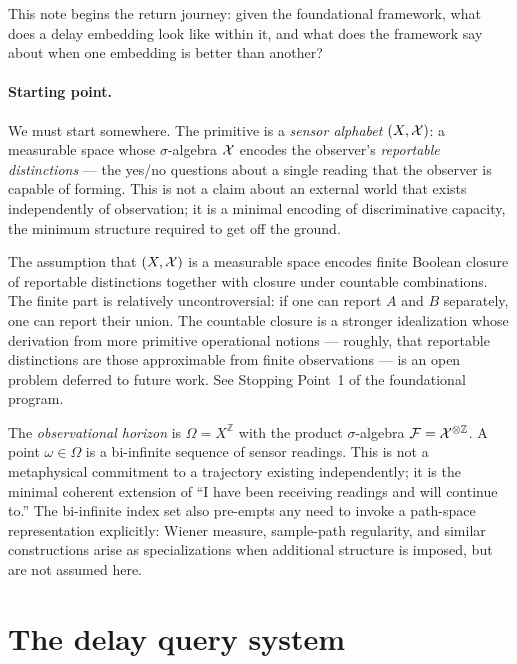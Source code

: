 This note begins the return journey: given the foundational framework, what does
a delay embedding look like within it, and what does the framework say about when
one embedding is better than another?

\paragraph{Starting point.}
We must start somewhere.  The primitive is a \emph{sensor alphabet} $(X, \mathcal{X})$:
a measurable space whose $\sigma$-algebra $\mathcal{X}$ encodes the observer's
\emph{reportable distinctions} --- the yes/no questions about a single reading
that the observer is capable of forming.  This is not a claim about an external
world that exists independently of observation; it is a minimal encoding of
discriminative capacity, the minimum structure required to get off the ground.

\begin{remark}
The assumption that $(X, \mathcal{X})$ is a measurable space encodes finite Boolean
closure of reportable distinctions together with closure under countable combinations.
The finite part is relatively uncontroversial: if one can report $A$ and $B$
separately, one can report their union.  The countable closure is a stronger
idealization whose derivation from more primitive operational notions --- roughly,
that reportable distinctions are those approximable from finite observations ---
is an open problem deferred to future work.  See Stopping Point~1 of the
foundational program.
\end{remark}

The \emph{observational horizon} is $\Omega = X^{\mathbb{Z}}$ with the product
$\sigma$-algebra $\mathcal{F} = \mathcal{X}^{\otimes \mathbb{Z}}$.  A point
$\omega \in \Omega$ is a bi-infinite sequence of sensor readings.  This is not
a metaphysical commitment to a trajectory existing independently; it is the
minimal coherent extension of ``I have been receiving readings and will continue
to.''  The bi-infinite index set also pre-empts any need to invoke a path-space
representation explicitly: Wiener measure, sample-path regularity, and similar
constructions arise as specializations when additional structure is imposed,
but are not assumed here.

\section{The delay query system}\label{sec:delay-query}

